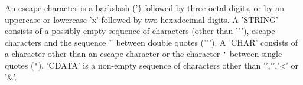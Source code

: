\documentclass[11pt,a4paper]{article}
\begin{document}
An escape character is a backslash ('\') followed by three octal 
digits, or by an uppercase or lowercase 'x' followed by two 
hexadecimal digits.  A 'STRING' consists of a possibly-empty sequence of 
characters (other than '"'), escape characters and the sequence '\"' 
between double quotes ('"').  A 'CHAR' consists of a character other than 
an escape character or the character \verb$'$ between single quotes (\verb$'$). 
'CDATA' is a non-empty sequence of characters other than '{','}','<' or '&'. 
 
\DeleteShortVerb{\'} 
 
 
\end{document}
